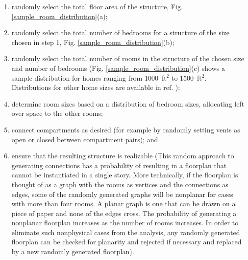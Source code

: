 \documentclass[12pt,twoside]{book}
\begin{document}
\begin{enumerate}
    \item randomly select the total floor area of the structure, Fig. \ref{sample_room_distribution}(a);
    \item randomly select the total number of bedrooms for a structure of the size chosen in step 1, Fig. \ref{sample_room_distribution}(b);
    \item randomly select the total number of rooms in the structure of the chosen size and number of bedrooms (Fig. \ref{sample_room_distribution}(c) shows a sample distribution for homes ranging from 1000~ft$^2$ to 1500~ft$^2$. Distributions for other home sizes are available in ref. \cite{AHS2015});
    \item determine room sizes based on a distribution of bedroom sizes, allocating left over space to the other rooms;
    \item connect compartments as desired (for example by randomly setting vents as open or closed between compartment pairs); and
    \item ensure that the resulting structure is realizable (This random approach to generating connections has a probability of resulting in a floorplan that cannot be instantiated in a single story. More technically, if the floorplan is thought of as a graph with the rooms as vertices and the connections as edges, some of the randomly generated graphs will be nonplanar for cases with more than four rooms. A planar graph is one that can be drawn on a piece of paper and none of the edges cross. The probability of generating a nonplanar floorplan increases as the number of rooms increases. In order to eliminate such nonphysical cases from the analysis, any randomly generated floorplan can be checked for planarity and rejected if necessary and replaced by a new randomly generated floorplan).
\end{enumerate}
\end{document}
